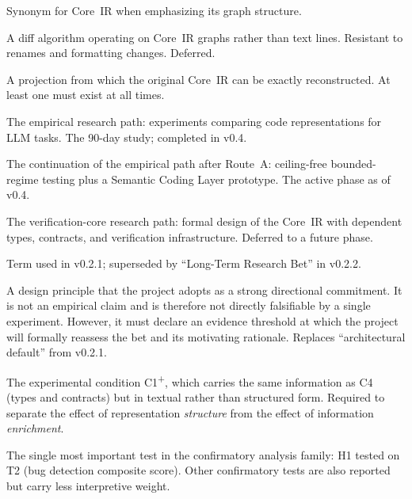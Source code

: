 \documentclass[11pt]{article}
\begin{document}
\begin{description}[style=nextline, leftmargin=3.5cm]
  \item[Semantic Graph]
    Synonym for Core~IR when emphasizing its graph structure.

  \item[Semantic Diff]
    A diff algorithm operating on Core~IR graphs rather than text
    lines.  Resistant to renames and formatting changes.  Deferred.

  \item[Lossless Projection]
    A projection from which the original Core~IR can be exactly
    reconstructed.  At least one must exist at all times.

  \item[Route A]
    The empirical research path: experiments comparing code
    representations for LLM tasks.  The 90-day study; completed in v0.4.

  \item[Route A2]
    The continuation of the empirical path after Route~A: ceiling-free
    bounded-regime testing plus a Semantic Coding Layer prototype.  The
    active phase as of v0.4.

  \item[Route B]
    The verification-core research path: formal design of the
    Core~IR with dependent types, contracts, and verification
    infrastructure.  Deferred to a future phase.

  \item[Architectural Default]
    Term used in v0.2.1; superseded by ``Long-Term Research Bet'' in
    v0.2.2.

  \item[Long-Term Research Bet]
    A design principle that the project adopts as a strong directional
    commitment.  It is not an empirical claim and is therefore not
    directly falsifiable by a single experiment.  However, it must
    declare an evidence threshold at which the project will formally
    reassess the bet and its motivating rationale.  Replaces
    ``architectural default'' from v0.2.1.

  \item[Information-Parity Control]
    The experimental condition C1\textsuperscript{+}, which carries
    the same information as C4 (types and contracts) but in textual
    rather than structured form.  Required to separate the effect of
    representation \emph{structure} from the effect of information
    \emph{enrichment}.

  \item[Primary Endpoint]
    The single most important test in the confirmatory analysis
    family: H1 tested on T2 (bug detection composite score).  Other
    confirmatory tests are also reported but carry less interpretive
    weight.


\end{description}
\end{document}
